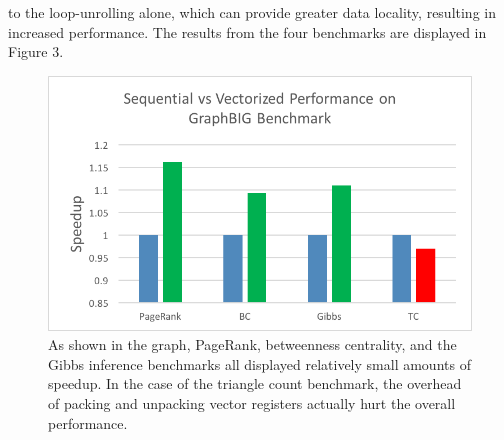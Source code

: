 \documentclass[conference]{IEEEtran}
\begin{document}
to the loop-unrolling alone, which can provide greater data locality, resulting in increased performance.  The results from the four benchmarks are displayed in Figure 3.  

\begin{figure}
\includegraphics[scale=0.7]{figures/benchmark1.png}
\caption{As shown in the graph, PageRank, betweenness centrality, and the Gibbs inference benchmarks all displayed relatively small amounts of speedup.  In the case of the triangle count benchmark, the overhead of packing and unpacking vector registers actually hurt the overall performance.  }
\end{figure}
\end{document}
